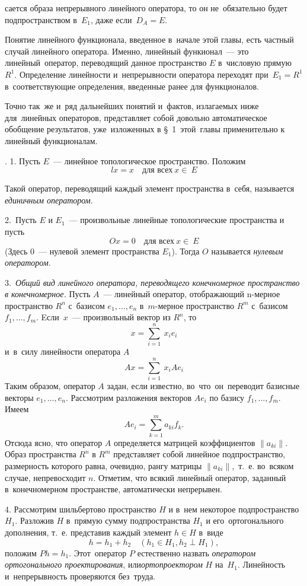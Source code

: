 \documentclass[10pt, a5paper]{book}
\begin{document}
\setcounter{page}{219}
сается образа непрерывного линейного оператора, то он не~обязательно будет подпространством в~$E_1$, даже если~$D_A = E$.

Понятие линейного функционала, введенное в~начале этой главы, есть частный случай линейного оператора. Именно, линейный функионал~--- это линейный~оператор, переводящий данное пространство $E$ в~числовую прямую $R^1$. Определение линейности и~непрерывности оператора переходят при~$E_1 = R^1$ в~соответствующие определения, введенные ранее для функционалов.

Точно так~же и~ряд дальнейших понятий и~фактов, излагаемых ниже для~линейных операторов, представляет собой довольно автоматическое обобщение результатов, уже~изложенных в \S~1~этой~главы применительно к линейный функционалам.

. 1. Пусть $E$~--- линейное топологическое пространство. Положим
$$lx = x \quad \text{для всех}~x\in~E$$

Такой оператор, переводящий каждый элемент пространства в~себя, называется {\it единичным оператором}.

2.~Пусть $E$ и $E_1$~--- произвольные линейные топологические пространства и пусть
$$Ox=0 \quad \text{для всех}~x\in~E$$ 
(Здесь $0$~--- нулевой элемент пространства $E_1$). Тогда $O$ назы\-вается {\it нулевым оператором}.

3.{\it~Общий вид линейного оператора, переводящего конечно\-мерное пространство в конечномерное.} Пусть $A$~--- линейный оператор, отображающий n-мерное пространство $R^n$ с~базисом $e_1,\dots,e_n$ в~$m$-мерное пространство $R^m$ с~базисом $f_1,\dots, f_m$. Eсли~$x$~--- произвольный вектор из $R^n$, то
$$x=\sum^n_{i=1}~x_i e_i$$
и~в~силу линейности оператора $A$
$$Ax=\sum^n_{i=1}~x_i A e_i$$
Таким образом, оператор $A$ задан, если известно, во~что~он~переводит базисные векторы $e_1,\dots, e_n$. Рассмотрим разложения векторов $Ae_i$ по базису $f_1,\dots,f_m$. Имеем
$$A e_i = \sum^m_{k=1} a_{ki} f_k .$$
Отсюда ясно, что оператор $A$ определяется матрицей коэффициентов $\|a_{ki}\|$. Образ пространства $R^n$ в $R^m$ представляет собой линейное подпространство, размерность которого равна, очевидно, рангу матрицы $\|a_{ki}\|$,~т.~е. во~всяком случае, непревосходит $n$. Отметим, что всякий линейный оператор, заданный в~конечномерном пространстве, автоматически непрерывен.

4. Рассмотрим шильбертово пространство $H$ и в~нем некоторое подпространство $H_1$. Разложив $H$ в~прямую сумму подпространства $H_1$ и его~ортогонального дополнения, т.~е. представив каждый элемент $h\in H$ в~виде
$$h = h_1 + h_2 \quad (h_1\in H_1, h_2 \perp H_1),$$
положим $Ph = h_1$. Этот~оператор $P$ естественно назвать {\it оператором ортогонального проектирования}, или{\it ортопроектором} $H$ на~$H_1$. Линейность и~непрерывность проверяются без~труда.
\end{document}
